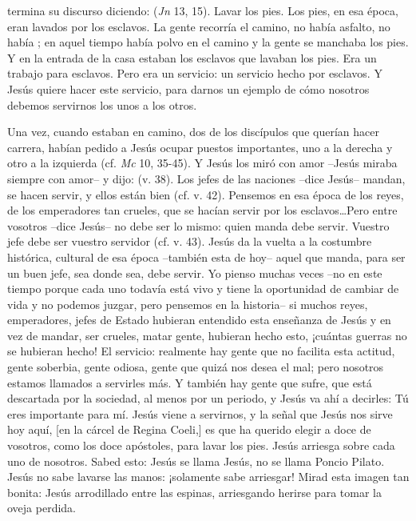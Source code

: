 \begin{body}
 termina su discurso diciendo:  (\textit{Jn} 13, 15). Lavar los pies. Los pies, en esa época, eran lavados por los esclavos. La gente recorría el camino, no había asfalto, no había ; en aquel tiempo había polvo en el camino y la gente se manchaba los pies. Y en la entrada de la casa estaban los esclavos que lavaban los pies. Era un trabajo para esclavos. Pero era un servicio: un servicio hecho por esclavos. Y Jesús quiere hacer este servicio, para darnos un ejemplo de cómo nosotros debemos servirnos los unos a los otros. 

Una vez, cuando estaban en camino, dos de los discípulos que querían hacer carrera, habían pedido a Jesús ocupar puestos importantes, uno a la derecha y otro a la izquierda (cf. \textit{Mc} 10, 35-45). Y Jesús los miró con amor –Jesús miraba siempre con amor– y dijo:  (v. 38). Los jefes de las naciones –dice Jesús– mandan, se hacen servir, y ellos están bien (cf. v. 42). Pensemos en esa época de los reyes, de los emperadores tan crueles, que se hacían servir por los esclavos\ldots Pero entre vosotros –dice Jesús– no debe ser lo mismo: quien manda debe servir. Vuestro jefe debe ser vuestro servidor (cf. v. 43). Jesús da la vuelta a la costumbre histórica, cultural de esa época –también esta de hoy– aquel que manda, para ser un buen jefe, sea donde sea, debe servir. Yo pienso muchas veces –no en este tiempo porque cada uno todavía está vivo y tiene la oportunidad de cambiar de vida y no podemos juzgar, pero pensemos en la historia– si muchos reyes, emperadores, jefes de Estado hubieran entendido esta enseñanza de Jesús y en vez de mandar, ser crueles, matar gente, hubieran hecho esto, ¡cuántas guerras no se hubieran hecho! El servicio: realmente hay gente que no facilita esta actitud, gente soberbia, gente odiosa, gente que quizá nos desea el mal; pero nosotros estamos llamados a servirles más. Y también hay gente que sufre, que está descartada por la sociedad, al menos por un periodo, y Jesús va ahí a decirles: Tú eres importante para mí. Jesús viene a servirnos, y la señal que Jesús nos sirve hoy aquí, [en la cárcel de Regina Coeli,] es que ha querido elegir a doce de vosotros, como los doce apóstoles, para lavar los pies. Jesús arriesga sobre cada uno de nosotros. Sabed esto: Jesús se llama Jesús, no se llama Poncio Pilato. Jesús no sabe lavarse las manos: ¡solamente sabe arriesgar! Mirad esta imagen tan bonita: Jesús arrodillado entre las espinas, arriesgando herirse para tomar la oveja perdida. 


\end{body}
